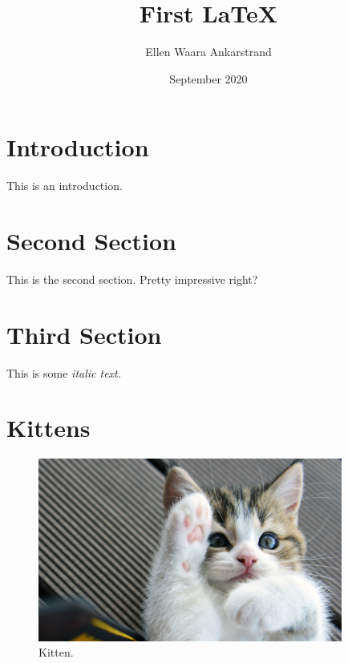 \documentclass{article}
\title{First LaTeX}
\author{Ellen Waara Ankarstrand}
\date{September 2020}
\begin{document}
\maketitle

\tableofcontents

\section{Introduction}
This is an introduction. 
\cite{forouzanfar2016global}

\section{Second Section} 
This is the second section. Pretty impressive right? 

\section{Third Section} 
This is some \textit{italic text.} 

\section{Kittens}

\begin{figure}[htp]
    \centering
    \includegraphics[width=10cm]{cute-kitten-animal-pics-cats-image-gallery-https3A2F2Fi.ytimg_.com2Fvi2F6FQsIfE7sZM2Fmaxresdefault}
    \caption{Kitten.}
    \label{fig:kitten}
\end{figure}
\end{document}
